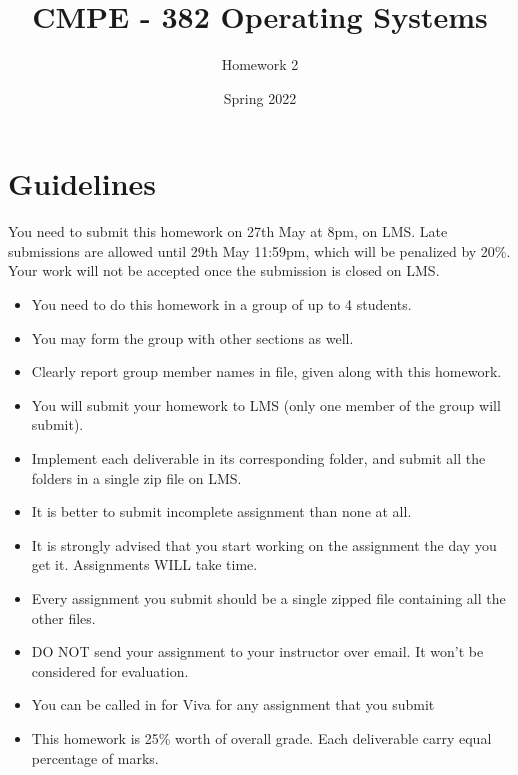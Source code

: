 \documentclass[a4paper,12pt]{article}
\begin{document}
	
	\title{CMPE - 382 Operating Systems }
	\author{Homework 2}
	\date{Spring 2022}
	\maketitle
	\section*{Guidelines}
	
	You need to submit this homework on  {\color{blue}27th May at 8pm}, on LMS. Late submissions are allowed until {\color{red} 29th May 11:59pm}, which will be penalized by 20\%. Your work will not be accepted once the submission is closed on LMS.

	
	\begin{itemize}
		\item You need to do this homework in a group of up to 4 students. 
		\item You may form the group with other sections as well. 
		\item Clearly report group member names in  file, given along with this homework. 
		\item You will submit your homework to LMS (only one member of the group will submit).
		\item Implement each deliverable in its corresponding folder, and submit all the folders in a single zip file on LMS.
		\item It is better to submit incomplete assignment than none at all.
		\item It is strongly advised that you start working on the assignment the day you get it. Assignments WILL take time.
		\item Every assignment you submit should be a single zipped file containing all the other files. 
		\item DO NOT send your assignment to your instructor over email. It won't be considered for evaluation. 
		\item You can be called in for Viva for any assignment that you submit
		\item This homework is 25\% worth of overall grade. Each deliverable carry equal percentage of marks.
	\end{itemize}
	
	
	
\end{document}
